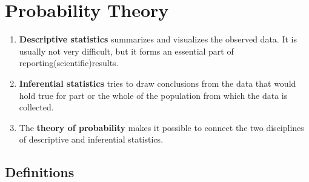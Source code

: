 \chapter{Probability Theory}


\begin{enumerate}
    \item \textbf{Descriptive statistics} summarizes and visualizes the observed data. It is usually not very difficult, but it forms an essential part of reporting(scientific)results.
    \hfill \cite{statistics/book/Statistics-for-Data-Scientists/Maurits-Kaptein}

    \item \textbf{Inferential statistics} tries to draw conclusions from the data that would hold true for part or the whole of the population from which the data is collected.
    \hfill \cite{statistics/book/Statistics-for-Data-Scientists/Maurits-Kaptein}

    \item The \textbf{theory of probability} makes it possible to connect the two disciplines of descriptive and inferential statistics.
    \hfill \cite{statistics/book/Statistics-for-Data-Scientists/Maurits-Kaptein}

\end{enumerate}


\section{Definitions}


